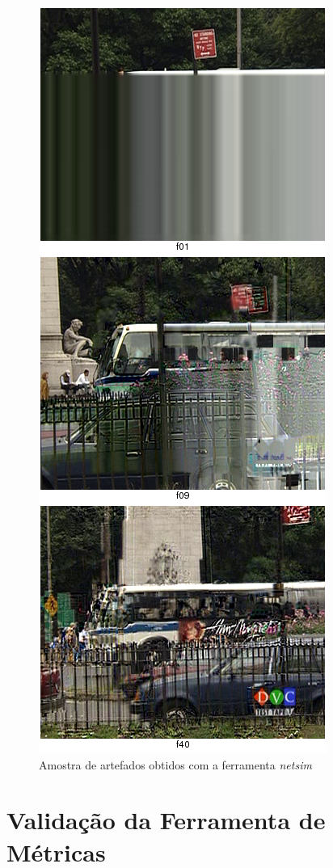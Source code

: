 \begin{figure}[!htb]
	\centering
	\includegraphics[height=0.9\textheight]{./imgs/netsimresult.png}
	\caption{Amostra de artefados obtidos com a ferramenta \emph{netsim}}
	\label{fig:netsim}
\end{figure}

\section{Validação da Ferramenta de Métricas}

